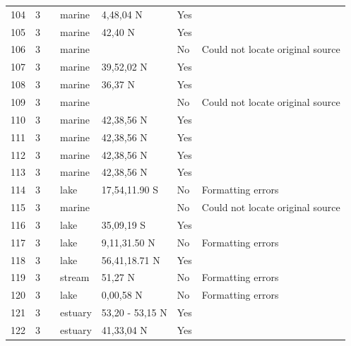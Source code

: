 \documentclass[12pt]{article}
\begin{document}
\begin{landscape}
\begin{table}[h!]
{\begin{tabular}{p{2.8cm}p{1.3cm}p{3cm}p{2.2cm}p{2.5cm}lp{8.2cm}}
        104   & 3 & \cite{Menge1976}  & marine & 4,48,04 N & Yes   &       \\
        105   & 3 & \cite{Edwards1982}  & marine & 42,40 N & Yes   &       \\
        106   & 3 & \cite{Glynn1965}  & marine &       & No    & Could not locate original source \\
        107   & 3 & \cite{Peterson1979}  & marine & 39,52,02 N & Yes   &       \\
        108   & 3 & \cite{Hewatt1937}  & marine & 36,37 N & Yes   &       \\
        109   & 3 & \cite{Castilla1981} & marine &       & No    & Could not locate original source \\
        110   & 3 & \cite{Dexter1947}  & marine & 42,38,56 N & Yes   &       \\
        111   & 3 & \cite{Dexter1947}  & marine & 42,38,56 N & Yes   &       \\
        112   & 3 & \cite{Dexter1947}  & marine & 42,38,56 N & Yes   &       \\
        113   & 3 & \cite{Dexter1947}  & marine & 42,38,56 N & Yes   &       \\
        114   & 3 & \cite{Marshall1982}  & lake  & 17,54,11.90 S & No  &  Formatting errors     \\
        115   & 3 & \cite{Koepcke1952}  & marine &       & No    & Could not locate original source \\
        116   & 3 & \cite{Hurlbert1972}  & lake  & 35,09,19 S & Yes   &       \\
        117   & 3 & \cite{Zaret1973}  & lake  & 9,11,31.50 N & No  &  Formatting errors     \\
        118   & 3 & \cite{Bindloss1972}  & lake  & 56,41,18.71 N & Yes   &       \\
        119   & 3 & \cite{Mann1972}  & stream & 51,27 N & No  &  Formatting errors     \\
        120   & 3 & \cite{Moriarty1973}  & lake  & 0,00,58 N & No  &  Formatting errors     \\
        121   & 3 & \cite{VanEs1977}  & estuary & 53,20 - 53,15 N & Yes   &       \\
        122   & 3 & \cite{Nixon1973}  & estuary & 41,33,04 N & Yes   &       \\
        \hline
      \end{tabular}}%
      \end{table}

        \newpage



\end{landscape}
\end{document}
